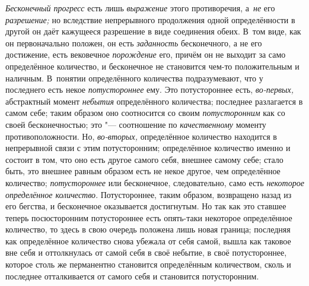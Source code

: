 {\em Бесконечный прогресс} есть лишь {\em выражение} этого противоречия,
а~{\em не} его {\em разрешение;} но вследствие непрерывного продолжения одной
определённости в другой он даёт кажущееся разрешение в виде соединения обеих. В~том
виде, как он первоначально положен, он есть {\em заданность}
бесконечного, а не его достижение, есть вековечное {\em порождение} его, причём
он не выходит за само определённое количество, и бесконечное не становится
чем-то положительным и наличным. В~понятии определённого количества
подразумевают, что у последнего есть некое {\em потустороннее} ему. Это
потустороннее есть, {\em во-первых,} абстрактный момент {\em небытия}
определённого количества; последнее разлагается в самом себе; таким образом оно
соотносится со своим {\em потусторонним} как со своей бесконечностью; это "---
соотношение по {\em качественному} моменту противоположности. Но,
{\em во-вторых,} определённое количество находится в непрерывной связи с этим
потусторонним; определённое количество именно и состоит в том, что оно есть
другое самого себя, внешнее самому себе; стало быть, это внешнее равным образом
есть не некое другое, чем определённое количество; {\em потустороннее} или
бесконечное, следовательно, само есть {\em некоторое определённое количество}.
Потустороннее, таким образом, возвращено назад из его бегства, и бесконечное
оказывается достигнутым. Но так как это ставшее теперь посюсторонним
потустороннее есть опять-таки некоторое определённое количество, то здесь
в свою очередь положена лишь новая граница; последняя как определённое
количество снова убежала от себя самой, вышла как таковое вне себя и
оттолкнулась от самой себя в своё небытие, в своё потустороннее, которое столь
же перманентно становится определённым количеством, сколь и последнее
отталкивается от самого себя и становится потусторонним.

